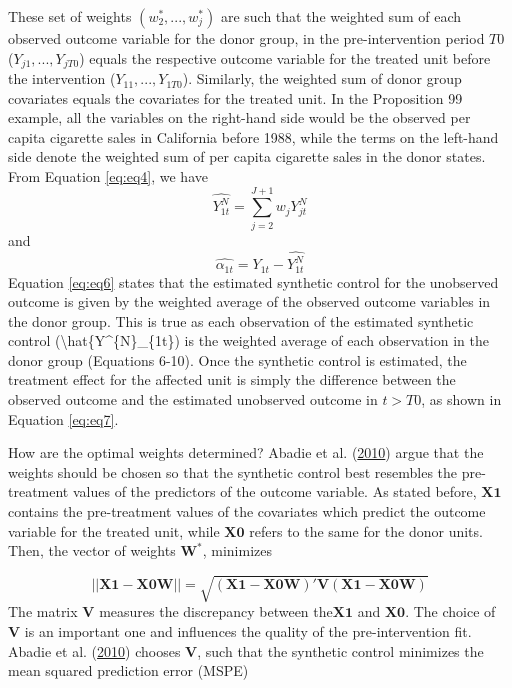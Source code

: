 \documentclass[12pt,nobind, a4paper]{reedthesis}
\begin{document}
 These set of weights \((w_{2}^{*},...,w_{j}^{*})\) are such that the weighted sum of each observed outcome variable for the donor group, in the pre-intervention period \(T0\) (\(Y_{j1},..., Y_{jT0}\)) equals the respective outcome variable for the treated unit before the intervention (\(Y_{11},...,Y_{1T0}\)). Similarly, the weighted sum of donor group covariates equals the covariates for the treated unit. In the Proposition 99 example, all the variables on the right-hand side would be the observed per capita cigarette sales in California before 1988, while the terms on the left-hand side denote the weighted sum of per capita cigarette sales in the donor states. From Equation \eqref{eq:eq4}, we have
 \begin{equation}
 \hat{Y^{N}_{1t}}=\sum_{j=2}^{J+1}w_{j}Y^{N}_{jt}
 \label{eq:eq6}
 \end{equation}
 and
 \begin{equation}
 \hat{\alpha_{1t}}={Y_{1t}}-\hat{Y^{N}_{1t}}
 \label{eq:eq7}
 \end{equation}
 Equation \eqref{eq:eq6} states that the estimated synthetic control for the unobserved outcome is given by the weighted average of the observed outcome variables in the donor group. This is true as each observation of the estimated synthetic control (\textbackslash hat\{Y\^{}\{N\}\_\{1t\}) is the weighted average of each observation in the donor group (Equations 6-10). Once the synthetic control is estimated, the treatment effect for the affected unit is simply the difference between the observed outcome and the estimated unobserved outcome in \(t>T0\), as shown in Equation \eqref{eq:eq7}.
 \linebreak

 How are the optimal weights determined? Abadie et al. (\protect\hyperlink{ref-abadie_synthetic_2010}{2010}) argue that the weights should be chosen so that the synthetic control best resembles the pre-treatment values of the predictors of the outcome variable. As stated before, \(\mathbf{X1}\) contains the pre-treatment values of the covariates which predict the outcome variable for the treated unit, while \(\mathbf{X0}\) refers to the same for the donor units. Then, the vector of weights \(\mathbf{W^*}\), minimizes

 \[||\mathbf{X1}-\mathbf{X0 W}||=\sqrt{(\mathbf{X1}-\mathbf{X0 W})' \mathbf{V} (\mathbf{X1}-\mathbf{X0 W})}\]
 The matrix \(\mathbf{V}\) measures the discrepancy between the\(\mathbf{X1}\) and \(\mathbf{X0}\). The choice of \(\mathbf{V}\) is an important one and influences the quality of the pre-intervention fit. Abadie et al. (\protect\hyperlink{ref-abadie_synthetic_2010}{2010}) chooses \(\mathbf{V}\), such that the synthetic control minimizes the mean squared prediction error (MSPE)
\end{document}
